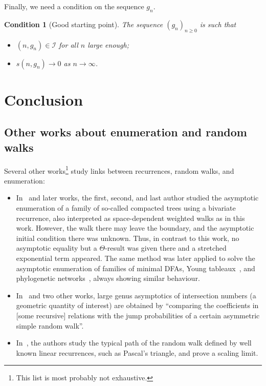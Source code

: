 \documentclass[a4paper,12pt]{article}
\newtheorem{condition}[theorem]{Condition}
\theoremstyle{definition}
\newcommand{\nto}{\ensuremath{n\rightarrow\infty}}
\begin{document}
Finally, we need a condition on the sequence $g_n$.
\begin{condition}[Good starting point]\label{assum_staring_point_general}
 The sequence $(g_n)_{n\geq 0}$ is such that
 \begin{itemize}
     \item $(n,g_n)\in \mathcal{I}$ for all $n$ large enough;
     \item $s(n,g_n)\to 0$ as $\nto$.
 \end{itemize}
\end{condition}




\section{Conclusion}\label{sec:discussion}

\subsection{Other works about enumeration and random walks}

Several other works\footnote{This list is most probably not exhaustive.} study links between recurrences, random walks, and enumeration:
\begin{itemize}
    \item In~\cite{compacted-tree} and later works, the first, second, and last author studied the asymptotic enumeration of a family of so-called compacted trees using a bivariate recurrence, also interpreted as space-dependent weighted walks as in this work. However, the walk there may leave the boundary, and the asymptotic initial condition there was unknown. Thus, in contrast to this work, no asymptotic equality but a $\Theta$-result was given there and a stretched exponential term appeared.
    The same method was later applied to solve the asymptotic enumeration of families of minimal DFAs, Young tableaux~\cite{banderier2021walls}, and phylogenetic networks~\cite{fuchs2021phylo}, always showing similar behaviour. 
    \item In~\cite{Agg} and two other works, large genus asymptotics of intersection numbers (a geometric quantity of interest) are obtained by ``comparing the coefficients in [some recursive] relations with the jump probabilities of a certain asymmetric simple random walk''.
    \item In~\cite{FlinChassaing}, the authors study the typical path of the random walk defined by well known linear recurrences, such as Pascal's triangle, and prove a scaling limit. 
\end{itemize}
\end{document}
